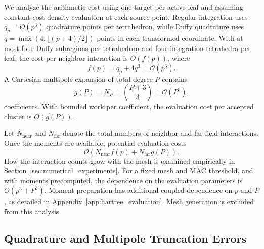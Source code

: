 \documentclass[a4paper,pdflatex,sn-mathphys-num]{sn-jnl}
\theoremstyle{thmstyleone}
\begin{document}
We analyze the arithmetic cost using one target per active leaf and assuming constant-cost density evaluation at each source point. Regular integration uses \(q_p=O(p^3)\) quadrature points per tetrahedron, while Duffy quadrature uses \(q=\max(4,\lfloor(p+4)/2\rfloor)\) points in each transformed coordinate. With at most four Duffy subregions per tetrahedron and four integration tetrahedra per leaf, the cost per neighbor interaction is \(O(f(p))\), where
\begin{equation}
f(p)=q_p+4q^3=\mathcal O(p^3).
\label{eq:quadrature_work_factor}
\end{equation}
A Cartesian multipole expansion of total degree \(P\) contains
\begin{equation}
g(P)=N_P=\binom{P+3}{3}
=\mathcal O(P^3).
\label{eq:expansion_work_factor}
\end{equation}
coefficients. With bounded work per coefficient, the evaluation cost per accepted cluster is \(O(g(P))\).

Let \(N_{\mathrm{near}}\) and \(N_{\mathrm{far}}\) denote the total numbers of
neighbor and far-field interactions. Once the moments are available, potential
evaluation costs
\begin{equation}
\mathcal O\!\left(
N_{\mathrm{near}}f(p)+N_{\mathrm{far}}g(P)
\right).
\label{eq:evaluation_complexity}
\end{equation}
How the interaction counts grow with the mesh is examined empirically in
Section~\ref{sec:numerical_experiments}. For a fixed mesh and MAC threshold,
and with moments precomputed, the dependence on the evaluation parameters is
\(O(p^3+P^3)\). Moment preparation has additional coupled dependence on \(p\)
and \(P\), as detailed in Appendix~\ref{app:hartree_evaluation}. Mesh
generation is excluded from this analysis.

\subsection{Quadrature and Multipole Truncation Errors}
\label{sec:error_analysis}
\end{document}
